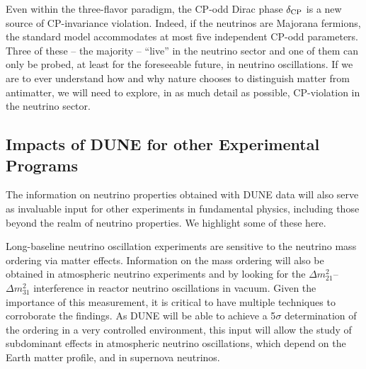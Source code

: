 Even within the three-flavor paradigm, the CP-odd Dirac phase $\delta_{\rm CP}$ is a new source of CP-invariance violation. Indeed, if the neutrinos are Majorana fermions, the standard model accommodates at most five independent CP-odd parameters. Three of these -- the majority -- ``live'' in the neutrino sector and one of them can only be probed, at least for the foreseeable future, in neutrino oscillations. If we are to ever understand how and why nature chooses to distinguish matter from antimatter, we will need to explore, in as much detail as possible, CP-violation in the neutrino sector. 


\subsection{Impacts of DUNE for other Experimental Programs}



The information on neutrino properties obtained with DUNE data will also serve as invaluable input for other experiments in fundamental physics, including those beyond the realm of neutrino properties. We highlight some of these here. 

Long-baseline neutrino oscillation experiments are sensitive to the neutrino mass ordering via matter effects. Information on the mass ordering will also be obtained in atmospheric neutrino experiments and by looking for the $\Delta m^2_{21}$--$\Delta m^2_{31}$ interference in reactor neutrino oscillations in vacuum. Given the importance of this measurement, it is critical to have multiple techniques to corroborate the findings. As DUNE will be able to achieve a 5$\sigma$ determination of the ordering in a very controlled environment, this input will allow the study of subdominant effects in atmospheric neutrino oscillations, which depend on the Earth matter profile, and in supernova neutrinos.
%


